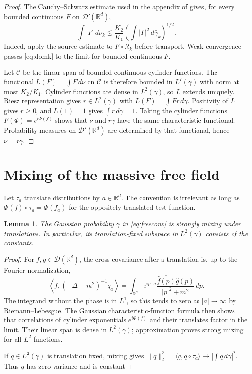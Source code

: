 \documentclass[11pt]{article}
\newtheorem{lemma}[theorem]{Lemma}
\newcommand{\R}{\mathbb R}
\newcommand{\D}{\mathcal D}
\begin{document}
\begin{proof}
The Cauchy--Schwarz estimate used in the appendix of \cite{source} gives, for
every bounded continuous $F$ on $\D'(\R^d)$,
\begin{equation}\label{eq:domk}
 \int|F|\,d\nu_k
 \le \frac{K_2}{K_1}
 \left(\int|F|^2\,d\bar\gamma_k\right)^{1/2}.
\end{equation}
Indeed, apply the source estimate to $F\circ R_k$ before transport.  Weak
convergence passes \eqref{eq:domk} to the limit for bounded continuous $F$.

Let $\mathcal C$ be the linear span of bounded continuous cylinder functions.
The functional $L(F)=\int F\,d\nu$ on $\mathcal C$ is therefore bounded in
$L^2(\gamma)$ with norm at most $K_2/K_1$.  Cylinder functions are dense in
$L^2(\gamma)$, so $L$ extends uniquely.  Riesz representation gives
$r\in L^2(\gamma)$ with $L(F)=\int Fr\,d\gamma$.  Positivity of $L$ gives
$r\ge0$, and $L(1)=1$ gives $\int r\,d\gamma=1$.  Taking the cylinder
functions $F(\Phi)=e^{i\Phi(f)}$ shows that $\nu$ and $r\gamma$ have the same
characteristic functional.  Probability measures on $\D'(\R^d)$ are
determined by that functional, hence $\nu=r\gamma$.
\end{proof}

\section{Mixing of the massive free field}

Let $\tau_a$ translate distributions by $a\in\R^d$.  The convention is
irrelevant as long as $\Phi(f)\circ\tau_a=\Phi(f_a)$ for the oppositely
translated test function.

\begin{lemma}\label{lem:mixing}
The Gaussian probability $\gamma$ in \eqref{eq:freeconv} is strongly mixing
under translations.  In particular, its translation-fixed subspace in
$L^2(\gamma)$ consists of the constants.
\end{lemma}

\begin{proof}
For $f,g\in\D(\R^d)$, the cross-covariance after a translation is, up to the
Fourier normalization,
\[
 \left\langle f,(-\Delta+m^2)^{-1}g_a\right\rangle
 =\int_{\R^d}e^{ip\cdot a}
 \frac{\overline{\widehat f(p)}\widehat g(p)}{|p|^2+m^2}\,dp.
\]
The integrand without the phase is in $L^1$, so this tends to zero as
$|a|\to\infty$ by Riemann--Lebesgue.  The Gaussian characteristic-function
formula then shows that correlations of cylinder exponentials
$e^{i\Phi(f)}$ and their translates factor in the limit.  Their linear span
is dense in $L^2(\gamma)$; approximation proves strong mixing for all
$L^2$ functions.

If $q\in L^2(\gamma)$ is translation fixed, mixing gives
$\|q\|_2^2=\langle q,q\circ\tau_a\rangle\to|\int q\,d\gamma|^2$.
Thus $q$ has zero variance and is constant.
\end{proof}
\end{document}

